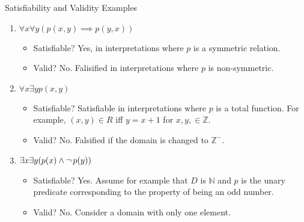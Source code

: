 \documentclass[style=sailor,size=12pt,mode=present]{powerdot}
\theoremstyle{definition}
\newenvironment{defn}[1]
  {\renewcommand\theinnerdefn{#1}\innerdefn}
  {\endinnerdefn}
\newcommand{\bb}[1]{\mathbb{#1}}
\newcommand{\Z}{\bb{Z}}
\newcommand{\N}{\bb{N}}
\begin{document}
\begin{wideslide}[bm=,toc=]{Satisfiability and Validity Examples}
\begin{defn}{7.25}{Ben Ari}
\end{defn}
\begin{enumerate}
\item<2-> $\forall x \forall y (p(x,y) \implies p(y,x))$
\begin{itemize}
\item<3-> Satisfiable? \pause[3] Yes, in interpretations where $p$ is a
symmetric relation.
\item<3-> Valid? \pause No. Falisified in interpretations where $p$ is
non-symmetric. 
\end{itemize}
\item<6-> $\forall x \exists y p(x,y)$
\begin{itemize}
\item<7-> Satisfiable? \pause[3] Satisfiable in interpretations where 
$p$ is a total function. For example, $(x,y) \in R$ iff $y = x + 1$
for $x,y, \in \Z$.
\item<7-> Valid? \pause No. Falsified if the domain is changed to $\Z^-$.  
\end{itemize}
\item<10-> $\exists x \exists y(p(x) \land \mathop{\neg} p (y))$
\begin{itemize}
\item<11-> Satisfiable? \pause[3] Yes. Assume for example that $D$ is $\N$ and
$p$ is the unary predicate corresponding to the property of being an
odd number.
\item<11-> Valid? \pause No. Consider a domain with only one element.
\end{itemize}
\end{enumerate}
\end{wideslide}
\end{document}
